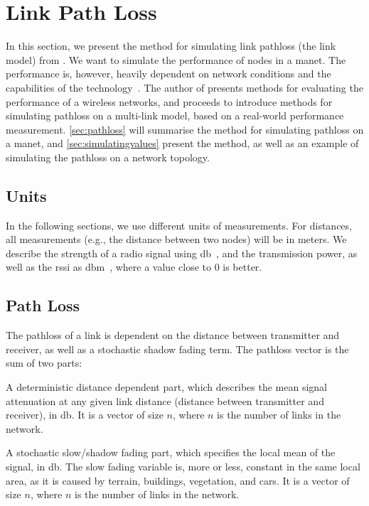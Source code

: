 \section{Link Path Loss}\label{sec:linkmodel}
In this section, we present the method for simulating link \gls{pathloss} (the link model) from \cite{paper:linkmodel}. We want to simulate the performance of nodes in a \gls{manet}. The performance is, however, heavily dependent on network conditions and the capabilities of the technology~\cite[p.~10]{paper:linkmodel}. The author of \cite{paper:linkmodel} presents methods for evaluating the performance of a wireless networks, and proceeds to introduce methods for simulating \gls{pathloss} on a multi-link model, based on a real-world performance measurement. \autoref{sec:pathloss} will summarise the method for simulating \gls{pathloss} on a \gls{manet}, and \autoref{sec:simulatingvalues} present the method, as well as an example of simulating the \gls{pathloss} on a network topology.%

\subsection{Units}
In the following sections, we use different units of measurements. For distances, all measurements (e.g., the distance between two nodes) will be in meters. We describe the strength of a radio signal using \acrshort{db}~\cite{website:isadbdbm}, and the transmission power, as well as the \gls{rssi} as \acrshort{dbm}~\cite{website:isadbdbm}, where a value close to 0 is better.

\subsection{Path Loss}\label{sec:pathloss}
The \gls{pathloss} of a link is dependent on the distance between transmitter and receiver, as well as a stochastic shadow fading term. The \gls{pathloss} vector  is the sum of two parts:

\begin{description}[style=nextline]
    \item[$\vect{l_d}$] A deterministic distance dependent part, which describes the mean signal attenuation at any given link distance (distance between transmitter and receiver), in \gls{db}. It is a vector of size $n$, where $n$ is the number of links in the network.
    \item[$\vect{l_{fading}}$] A stochastic slow/shadow fading part, which specifies the local mean of the signal, in \gls{db}. The slow fading variable is, more or less, constant in the same local area, as it is caused by terrain, buildings, vegetation, and cars. It is a vector of size $n$, where $n$ is the number of links in the network.
\end{description}

